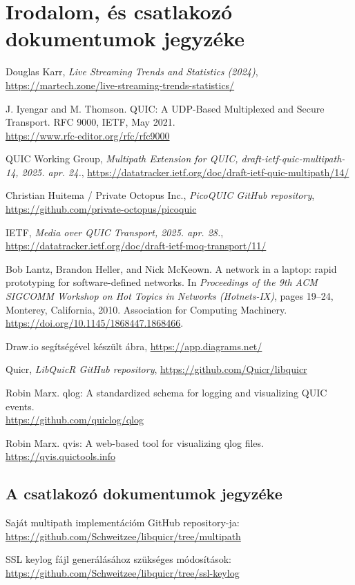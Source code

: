 \documentclass[a4paper,oneside]{article}
\begin{document}
\section{Irodalom, és csatlakozó dokumentumok jegyzéke}
\label{sec:irod-es-csatl}

\begin{thebibliography}{9}
\label{sec:tanulm-irod-jegyz}

 Douglas Karr, \emph{Live Streaming Trends and Statistics (2024)}, 
\url{https://martech.zone/live-streaming-trends-statistics/}

 J. Iyengar and M. Thomson.
\newblock QUIC: A UDP-Based Multiplexed and Secure Transport.
\newblock RFC 9000, IETF, May 2021.\\
\url{https://www.rfc-editor.org/rfc/rfc9000}

 QUIC Working Group, \emph{Multipath Extension for QUIC, draft-ietf-quic-multipath-14, 2025. apr. 24.}, \url{https://datatracker.ietf.org/doc/draft-ietf-quic-multipath/14/}

 Christian Huitema / Private Octopus Inc., \emph{PicoQUIC GitHub repository}, \url{https://github.com/private-octopus/picoquic}

 IETF, \emph{Media over QUIC Transport, 2025. apr. 28.}, \url{https://datatracker.ietf.org/doc/draft-ietf-moq-transport/11/}

Bob Lantz, Brandon Heller, and Nick McKeown.
\newblock A network in a laptop: rapid prototyping for software-defined networks.
\newblock In \emph{Proceedings of the 9th ACM SIGCOMM Workshop on Hot Topics in Networks (Hotnets-IX)}, pages 19--24, Monterey, California, 2010.
\newblock Association for Computing Machinery. \url{https://doi.org/10.1145/1868447.1868466}.

 Draw.io segítségével készült ábra, \url{https://app.diagrams.net/}

 Quicr, \emph{LibQuicR GitHub repository}, \url{https://github.com/Quicr/libquicr}

Robin Marx.
\newblock qlog: A standardized schema for logging and visualizing QUIC events.\\
\url{https://github.com/quiclog/qlog}

Robin Marx.
\newblock qvis: A web-based tool for visualizing qlog files.\\
\url{https://qvis.quictools.info}

\end{thebibliography}

\subsection{A csatlakozó dokumentumok jegyzéke}
\label{sec:csat-irod}

Saját multipath implementációm GitHub repository-ja: \url{https://github.com/Schweitzee/libquicr/tree/multipath}

SSL keylog fájl generálásához szükséges módosítások: \url{https://github.com/Schweitzee/libquicr/tree/ssl-keylog}
\end{document}
